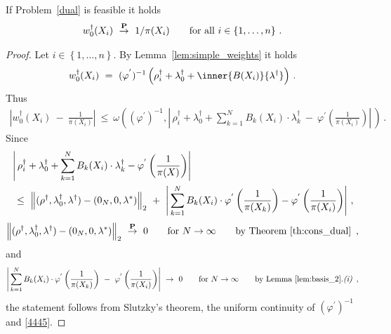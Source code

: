 \begin{theorem}
  If Problem~\ref{dual} is feasible it holds
  \begin{align*}
  w_0^\dagger(X_i)
  \ 
  \overset{\P}{\to}
  \ 
  1/\pi(X_i)
  \qquad
  \text{for all}\ 
  i\in \left\{ 1,\ldots,n \right\}
  \,.
  \end{align*}
\end{theorem}
\begin{proof}
  Let $i\in \left\{ 1,\ldots,n \right\}$.
  By Lemma~\ref{lem:simple_weights}
  it holds
  \begin{align*}
    w_0^\dagger(X_i)
    \ 
    =
    \ 
      (\varphi^{'})^{-1}
      \left( 
        \rho_i^\dagger
        +
        \lambda_0^\dagger
        +
        \inner{B(X_i)}{\lambda^\dagger}
      \right)
      \,.
  \end{align*}
  Thus
  \begin{align}
    \label{4445}
    \left| 
    w_0^\dagger(X_i)
    \ 
    -
    \ 
    \frac{1}{\pi(X_i)}
    \right|
    \
    \le
    \
    \omega
    \left( 
      (\varphi^{'})^{-1}
      ,
      \left| 
      \,
      \rho_i^\dagger
      +
      \lambda_0^\dagger
      +
      \sum_{k=1}^{N} 
      B_k(X_i)\cdot\lambda_k^\dagger
      \ 
      -
      \ 
      \varphi^{'}
      \left( \frac{1}{\pi(X_i)} \right)
      \right|
      \,
    \right)
    \,.
  \end{align}
  Since
  \begin{align*}
      &
      \left| 
      \,
      \rho_i^\dagger
      +
      \lambda_0^\dagger
      +
      \sum_{k=1}^{N} 
      B_k(X_i)\cdot\lambda_k^\dagger-
      \varphi^{'}
      \left( \frac{1}{\pi(X)} \right)
      \right|
      \\
      &
      \ 
      \le
      \ 
      \norm{
        (\rho^\dagger,\lambda_0^\dagger,\lambda^\dagger)
        -
        (0_N,0,\lambda^*)
      }_2
      \ 
      +
      \ 
      \left| 
      \,
      \sum_{k=1}^{N} 
      B_k(X_i)\cdot
      \varphi^{'}
      \left( \frac{1}{\pi(X_k)} \right)
      -
      \varphi^{'}
      \left( \frac{1}{\pi(X_i)} \right)
      \right|
      \,,
  \end{align*}
  \begin{align*}
      \norm{
        (\rho^\dagger,\lambda_0^\dagger,\lambda^\dagger)
        -
        (0_N,0,\lambda^*)
      }_2
      \ 
      \overset{\P}{\to}
      \ 
      0
      \qquad
      \text{for}
      \ 
      N\to\infty
      \qquad
      \text{by Theorem~\ref{th:cons_dual}
      }
      \,,
  \end{align*}
  and
  \begin{align*}
      \left| 
      \,
      \sum_{k=1}^{N} 
      B_k(X_i)\cdot
      \varphi^{'}
      \left( \frac{1}{\pi(X_k)} \right)
      \ 
      -
      \ 
      \varphi^{'}
      \left( \frac{1}{\pi(X_i)} \right)
      \right|
      \ 
      \to
      \ 
      0
      \qquad
      \text{for}
      \ 
      N\to\infty
      \qquad
      \text{by Lemma~\ref{lem:basis_2}.\textit{(i)}
      }
      \,,
  \end{align*}
  the statement follows from Slutzky's theorem, the uniform continuity of 
  $
  (
      \varphi^{'}
      )^{-1}
    $ 
    and \eqref{4445}.
\end{proof}
